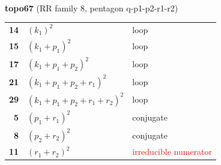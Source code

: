 \documentclass[10pt]{article}
\begin{document}
\begin{minipage}[t]{0.48\textwidth}
{}\\[2mm]\textbf{topo67} (RR family 8, pentagon q-p1-p2-r1-r2)\\[2pt]{\footnotesize\begin{tabular}{@{}r@{\ \ }l@{\ \ }l@{}}\textbf{14} & $(k_1)^2$ & loop\\
\textbf{15} & $(k_1+p_1)^2$ & loop\\
\textbf{17} & $(k_1+p_1+p_2)^2$ & loop\\
\textbf{21} & $(k_1+p_1+p_2+r_1)^2$ & loop\\
\textbf{29} & $(k_1+p_1+p_2+r_1+r_2)^2$ & loop\\
\textbf{5} & $(p_1+r_1)^2$ & conjugate\\
\textbf{8} & $(p_2+r_2)^2$ & conjugate\\
\textbf{11} & $(r_1+r_2)^2$ & \textcolor{red}{irreducible numerator}\\\end{tabular}}\end{minipage}\hfill%
\end{document}
